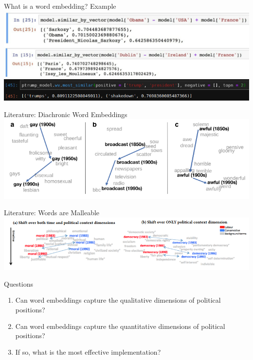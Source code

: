 \documentclass[10pt]{beamer}
\begin{document}
\begin{frame}{What is a word embedding? Example}
  \includegraphics[width=1\textwidth]{vectormath1.jpg}
  \cite{word2vec}
  \includegraphics[width=1\textwidth]{trump_math.png}
\end{frame}

\begin{frame}{Literature: Diachronic Word Embeddings}
  \includegraphics[width=1\textwidth]{diachronic.png}
  \cite{diachronic}
\end{frame}

\begin{frame}{Literature: Words are Malleable}
  \includegraphics[width=1\textwidth]{malleable.png}
  \cite{malleable}
\end{frame}

\begin{frame}{Questions}
  \begin{enumerate}
      \item Can word embeddings capture the qualitative dimensions of political positions?
      \item Can word embeddings capture the quantitative dimensions of political positions?
      \item If so, what is the most effective implementation?
  \end{enumerate}    
\end{frame}
\end{document}
